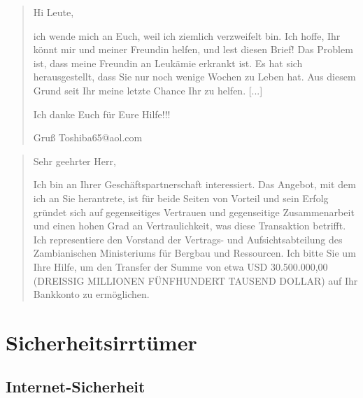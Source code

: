 \begin{frame}
\begin{quotation}
Hi Leute,

ich wende mich an Euch, weil ich ziemlich verzweifelt bin. Ich hoffe, Ihr könnt mir und meiner Freundin helfen, und lest diesen Brief! Das Problem ist, dass meine Freundin an Leukämie erkrankt ist. Es hat sich herausgestellt, dass Sie nur noch wenige Wochen zu Leben hat. Aus diesem Grund seit Ihr meine letzte Chance Ihr zu helfen. 
[...]

Ich danke Euch für Eure Hilfe!!!

Gruß Toshiba65@aol.com
\end{quotation}
\end{frame}


\begin{frame}
\begin{quotation}
Sehr geehrter Herr,

Ich bin an Ihrer Geschäftspartnerschaft interessiert. Das Angebot, mit dem ich an Sie herantrete, ist für beide Seiten von Vorteil und sein Erfolg gründet sich auf gegenseitiges Vertrauen und gegenseitige Zusammenarbeit und einen hohen Grad an Vertraulichkeit, was diese Transaktion betrifft. Ich representiere den Vorstand der Vertrags- und Aufsichtsabteilung des Zambianischen Ministeriums für Bergbau und Ressourcen. Ich bitte Sie um Ihre Hilfe, um den Transfer der Summe von etwa USD 30.500.000,00 (DREISSIG MILLIONEN FÜNFHUNDERT TAUSEND DOLLAR) auf Ihr Bankkonto zu ermöglichen.
\end{quotation}
\end{frame}

\section{Sicherheitsirrtümer}

\subsection{Internet-Sicherheit}



